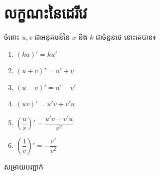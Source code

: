 \documentclass[12pt,fleqn]{book} %
\newcommand{\solution}{{\begin{center}\kml \color{magenta} សម្រាយបញ្ជាក់\end{center} }}
\begin{document}
 \section{លក្ខណះនៃដេរីវេ}
 \begin{property}
 ចំពោះ $u,v$ ជាអនុគមន៍នៃ $x$ និង $k$ ជាចំនួនថេ នោះគេបាន៖
 \begin{multicols}{3}
 \begin{enumerate}
 \item $(ku)'=ku'$
 \item $(u+ v)'=u'+ v$
 \item $(u-v)'=u'-v'$
 \item $(uv)'=u'v+v'u$
 \item $\left(\dfrac{u}{v}\right)'=\dfrac{u'v-v'u}{v^2}$
 \item $\left(\dfrac{1}{v}\right)'=-\dfrac{v'}{v^2}$
 \end{enumerate}
 \end{multicols}
 \end{property}
 \solution 
\end{document}
